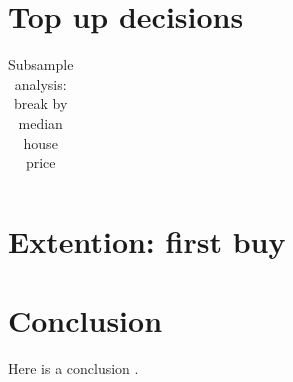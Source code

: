 \documentclass[12pt]{article}
\begin{document}
\section{Top up decisions}

	




\begin{table}
	\centering
	\small
	\caption{Subsample analysis: break by median house price}
	\begin{tabular}{ll}

	\end{tabular}
\end{table}
	




\newpage

\section{Extention: first buy}







\newpage

\section{Conclusion}
Here is a conclusion \citep{hartzmark2015worst}.

\printbibliography
\end{document}
